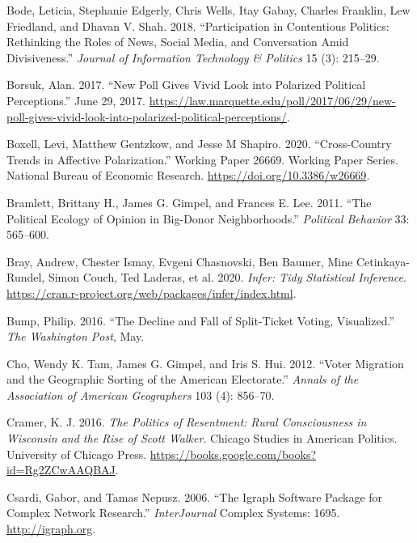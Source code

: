 \documentclass[12pt,]{article}
\begin{document}
\leavevmode\hypertarget{ref-bode2018}{}%
Bode, Leticia, Stephanie Edgerly, Chris Wells, Itay Gabay, Charles
Franklin, Lew Friedland, and Dhavan V. Shah. 2018. ``Participation in
Contentious Politics: Rethinking the Roles of News, Social Media, and
Conversation Amid Divisiveness.'' \emph{Journal of Information
Technology \& Politics} 15 (3): 215--29.

\leavevmode\hypertarget{ref-borsuk2017}{}%
Borsuk, Alan. 2017. ``New Poll Gives Vivid Look into Polarized Political
Perceptions.'' June 29, 2017.
\url{https://law.marquette.edu/poll/2017/06/29/new-poll-gives-vivid-look-into-polarized-political-perceptions/}.

\leavevmode\hypertarget{ref-boxell2020}{}%
Boxell, Levi, Matthew Gentzkow, and Jesse M Shapiro. 2020.
``Cross-Country Trends in Affective Polarization.'' Working Paper 26669.
Working Paper Series. National Bureau of Economic Research.
\url{https://doi.org/10.3386/w26669}.

\leavevmode\hypertarget{ref-bramlett2011}{}%
Bramlett, Brittany H., James G. Gimpel, and Frances E. Lee. 2011. ``The
Political Ecology of Opinion in Big-Donor Neighborhoods.''
\emph{Political Behavior} 33: 565--600.

\leavevmode\hypertarget{ref-infer}{}%
Bray, Andrew, Chester Ismay, Evgeni Chasnovski, Ben Baumer, Mine
Cetinkaya-Rundel, Simon Couch, Ted Laderas, et al. 2020. \emph{Infer:
Tidy Statistical Inference}.
\url{https://cran.r-project.org/web/packages/infer/index.html}.

\leavevmode\hypertarget{ref-bump2016}{}%
Bump, Philip. 2016. ``The Decline and Fall of Split-Ticket Voting,
Visualized.'' \emph{The Washington Post}, May.

\leavevmode\hypertarget{ref-cho2012}{}%
Cho, Wendy K. Tam, James G. Gimpel, and Iris S. Hui. 2012. ``Voter
Migration and the Geographic Sorting of the American Electorate.''
\emph{Annals of the Association of American Geographers} 103 (4):
856--70.

\leavevmode\hypertarget{ref-cramer2016}{}%
Cramer, K. J. 2016. \emph{The Politics of Resentment: Rural
Consciousness in Wisconsin and the Rise of Scott Walker}. Chicago
Studies in American Politics. University of Chicago Press.
\url{https://books.google.com/books?id=Rg2ZCwAAQBAJ}.

\leavevmode\hypertarget{ref-igraph}{}%
Csardi, Gabor, and Tamas Nepusz. 2006. ``The Igraph Software Package for
Complex Network Research.'' \emph{InterJournal} Complex Systems: 1695.
\url{http://igraph.org}.
\end{document}

